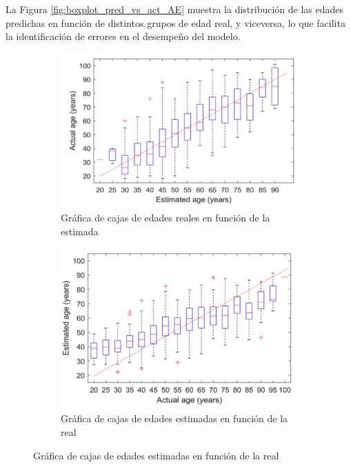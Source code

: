 \begin{itemize}
    La Figura \ref{fig:boxplot_pred_vs_act_AE} muestra la distribución de las edades predichas en función de 
    distintos grupos de edad real, y viceversa, lo que facilita la identificación de errores en el desempeño 
    del modelo.

    \begin{figure}[h]
        \centering
    
        \begin{subfigure}[b]{0.45\textwidth}
            \centering
            \includegraphics[width=\textwidth]{capitulos/cap_02/imagenes/boxplot_pred_vs_act_AE_1.png}
            \caption{Gráfica de cajas de edades reales en función de la estimada}
            \label{fig:boxplot_pred_vs_act_AE_a}
        \end{subfigure}
        \hfill
        \begin{subfigure}[b]{0.45\textwidth}
            \centering
            \includegraphics[width=\textwidth]{capitulos/cap_02/imagenes/boxplot_pred_vs_act_AE_2.png}
            \caption{Gráfica de cajas de edades estimadas en función de la real}
            \label{fig:boxplot_pred_vs_act_AE_b}
        \end{subfigure}
    

\end{figure}
\end{itemize}
